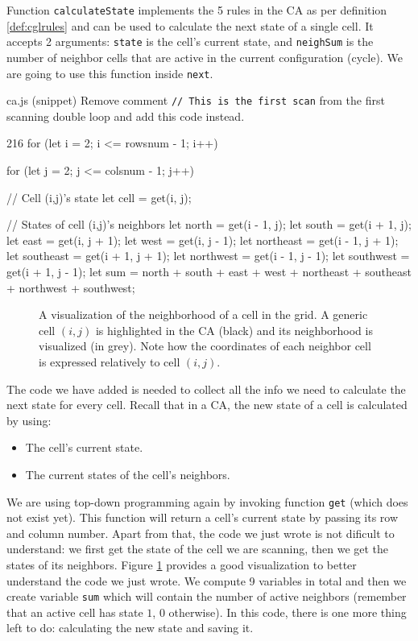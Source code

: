 Function \texttt{calculateState} implements the 5 rules in the CA as per definition \ref{def:cglrules} and
can be used to calculate the next state of a single cell.
It accepts 2 arguments: \texttt{state} is the cell's current state, and \texttt{neighSum} is the number of
neighbor cells that are active in the current configuration (cycle).
We are going to use this function inside \texttt{next}.

\begin{programcode}{ca.js (snippet)}
Remove comment \texttt{// This is the first scan} from the first scanning double loop and add this
code instead.
\begin{codeh1}{2}{16}
for (let i = 2; i <= rowsnum - 1; i++) {
  for (let j = 2; j <= colsnum - 1; j++) {
    // Cell (i,j)'s state
    let cell = get(i, j);

    // States of cell (i,j)'s neighbors
    let north = get(i - 1, j);
    let south = get(i + 1, j);
    let east = get(i, j + 1);
    let west = get(i, j - 1);
    let northeast = get(i - 1, j + 1);
    let southeast = get(i + 1, j + 1);
    let northwest = get(i - 1, j - 1);
    let southwest = get(i + 1, j - 1);
    let sum = north + south + east + west + northeast + southeast + northwest + southwest;
  }
}
\end{codeh1}
\end{programcode}

%
\begin{figure}[b]
\sidecaption

%
%
\caption{A visualization of the neighborhood of a cell in the grid.
A generic cell $(i,j)$ is highlighted in the CA (black)
and its neighborhood is visualized (in grey).
Note how the coordinates of each neighbor cell is expressed relatively
to cell $(i,j)$.}
\label{fig:cellneigh}
\end{figure}
%

The code we have added is needed to collect all the info we need to calculate the next state for every cell.
Recall that in a CA, the new state of a cell is calculated by using:

\begin{itemize}
\item The cell's current state.
\item The current states of the cell's neighbors.
\end{itemize}

We are using top-down programming again by invoking function \texttt{get} (which does not exist yet). This function
will return a cell's current state by passing its row and column number. Apart from that, the code we
just wrote is not dificult to understand: we first get the state of the cell we are scanning, then we get the states
of its neighbors. Figure \ref{fig:cellneigh} provides a good visualization to better understand the code we just
wrote.
We compute 9 variables in total and then we create variable \texttt{sum} which will
contain the number of active neighbors (remember that an active cell has state $1$, $0$ otherwise). In this
code, there is one more thing left to do: calculating the new state and saving it.


